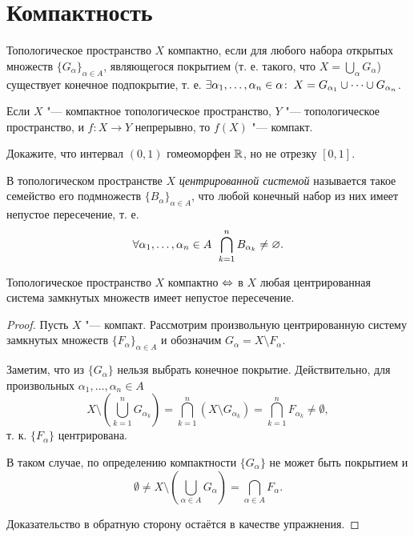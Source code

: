 \documentclass[main]{subfiles}
\begin{document}
\section{Компактность}

\begin{definition}
  Топологическое пространство \( X \) компактно,
  если для любого набора открытых множеств
  \( {\{ G_\alpha \}}_{\alpha \in A} \),
  являющегося покрытием
  (т. е. такого, что \( X = \bigcup_\alpha G_\alpha \))
  существует конечное подпокрытие, т. е.
  \( \exists \alpha_1, \dots, \alpha_n \in \alpha \colon \:
  X = G_{\alpha_1} \cup \dots \cup G_{\alpha_n} \).
\end{definition}

\begin{exercise}
  Если \( X \) "--- компактное топологическое пространство,
  \( Y \) "--- топологическое пространство,
  и \( f : X \to Y \) непрерывно,
  то \( f(X) \) "--- компакт.
\end{exercise}

\begin{exercise}
  Докажите, что интервал \( (0, 1) \) гомеоморфен \( \mathbb{R} \),
  но не отрезку \( [0, 1] \).
\end{exercise}

\begin{definition}
  В топологическом пространстве \( X \)
  \emph{центрированной системой}
  называется такое семейство его подмножеств
  \( {\{ B_\alpha \}}_{\alpha \in A} \),
  что любой конечный набор из них имеет непустое пересечение,
  т. е.
  \[
    \forall {\alpha_1, \dots, \alpha_n \in A} \; \,
    \bigcap_{k = 1}^n B_{\alpha_k} \ne \varnothing.
  \]
\end{definition}

\begin{theorem}\label{thm:compact-centered}
  Топологическое пространство \( X \) компактно
  \( \Leftrightarrow \)
  в \( X \) любая центрированная система замкнутых
  множеств имеет непустое пересечение.
\end{theorem}
\begin{proof}
  Пусть \( X \) "--- компакт. Рассмотрим
  произвольную центрированную систему замкнутых множеств
  \( {\{ F_\alpha \}}_{\alpha \in A} \) и обозначим
  \( G_\alpha = X \setminus F_\alpha \).

  Заметим, что из \( \{ G_\alpha \} \) нельзя выбрать
  конечное покрытие. Действительно, для произвольных
  \( \alpha_1, \dots, \alpha_n \in A \)
  \[
    X \setminus \left( \bigcup_{k=1}^n G_{\alpha_k} \right) =
    \bigcap_{k = 1}^n (X \setminus G_{\alpha_k}) =
    \bigcap_{k = 1}^n F_{\alpha_k} \ne \emptyset,
  \]
  т. к. \( \{ F_\alpha \} \) центрирована.

  В таком случае, по определению компактности \( \{ G_\alpha \} \)
  не может быть покрытием и
  \[
    \emptyset \ne
    X \setminus \left( \bigcup_{\alpha \in A } G_{\alpha} \right) =
    \bigcap_{\alpha \in A} F_{\alpha}.
  \]

  Доказательство в обратную сторону остаётся в качестве упражнения.
\end{proof}
\end{document}
